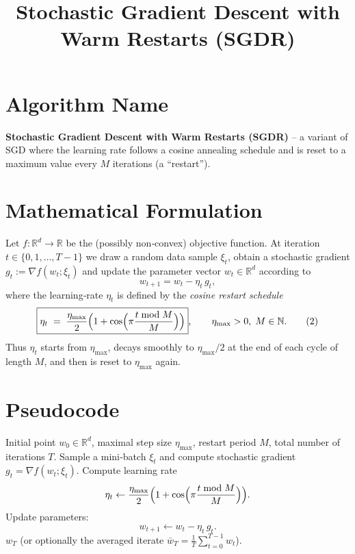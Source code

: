 \documentclass{article}
\title{Stochastic Gradient Descent with Warm Restarts (SGDR)}
\author{}
\date{}
\newcommand{\R}{\mathbb{R}}
\begin{document}
\maketitle

\section*{Algorithm Name}
\textbf{Stochastic Gradient Descent with Warm Restarts (SGDR)} – a variant of SGD
where the learning rate follows a cosine annealing schedule and is reset to a
maximum value every $M$ iterations (a ``restart'').

\section*{Mathematical Formulation}
Let $f:\R^{d}\rightarrow\R$ be the (possibly non‑convex) objective function.
At iteration $t\in\{0,1,\dots,T-1\}$ we draw a random data sample $\xi_t$,
obtain a stochastic gradient $g_t:=\nabla f(w_t;\xi_t)$ and update the
parameter vector $w_t\in\R^{d}$ according to
\[
\boxed{w_{t+1}=w_t-\eta_t\,g_t},
\tag{1}
\]
where the learning‑rate $\eta_t$ is defined by the \emph{cosine restart
schedule}
\[
\boxed{
\eta_t \;=\;
\frac{\eta_{\max}}{2}\Bigl(1+\cos\Bigl(\pi\frac{t\bmod M}{M}\Bigr)\Bigr)},
\qquad
\eta_{\max}>0,\;M\in\mathbb{N}.
\tag{2}
\]
Thus $\eta_t$ starts from $\eta_{\max}$, decays smoothly to
$\eta_{\max}/2$ at the end of each cycle of length $M$, and then is
reset to $\eta_{\max}$ again.

\section*{Pseudocode}
\begin{algorithm}[H]
\caption{SGDR}
\begin{algorithmic}[1]
\Require Initial point $w_0\in\R^{d}$, maximal step size $\eta_{\max}$,
restart period $M$, total number of iterations $T$.
    \State Sample a mini‑batch $\xi_t$ and compute stochastic gradient
          $g_t=\nabla f(w_t;\xi_t)$.
    \State Compute learning rate
          \[
          \eta_t\gets\frac{\eta_{\max}}{2}\Bigl(1+\cos\Bigl(\pi\frac{t\bmod M}{M}\Bigr)\Bigr).
          \]
    \State Update parameters:
          \[
          w_{t+1}\gets w_t-\eta_t\,g_t.
          \]
\EndFor
\State \Return $w_T$ (or optionally the averaged iterate
          $\bar w_T=\frac1T\sum_{t=0}^{T-1}w_t$).
\end{algorithmic}
\end{algorithm}
\end{document}
